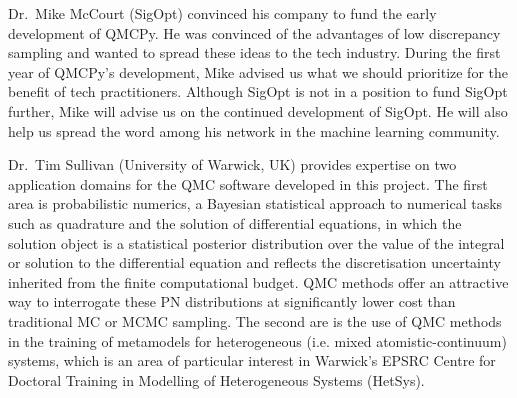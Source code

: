 \documentclass[11pt]{NSFamsart}
\begin{document}
Dr.\ Mike McCourt (SigOpt) convinced his company to fund the early development of QMCPy.  He was convinced of the advantages of low discrepancy sampling and wanted to spread these ideas to the tech industry.  During the first year of QMCPy's development, Mike advised us what we should prioritize for the benefit of tech practitioners.  Although SigOpt is not in a position to  fund SigOpt further, Mike will advise us on the continued development of SigOpt.  He will also help us spread the word among his network in the machine learning community.

Dr.\ Tim Sullivan (University of Warwick, UK) provides expertise on two application domains for the QMC software developed in this project.  The first area is probabilistic numerics, a Bayesian statistical approach to numerical tasks such as quadrature and the solution of differential equations, in which the solution object is a statistical posterior distribution over the value of the integral or solution to the differential equation and reflects the discretisation uncertainty inherited from the finite computational budget.  QMC methods offer an attractive way to interrogate these PN distributions at significantly lower cost than traditional MC or MCMC sampling.  The second are is the use of QMC methods in the training of metamodels for heterogeneous (i.e. mixed atomistic-continuum) systems, which is an area of particular interest in Warwick's EPSRC Centre for Doctoral Training in Modelling of Heterogeneous Systems (HetSys).




\newpage
\clearpage
\setcounter{page}{1}




{\renewcommand\addcontentsline[3]{} 
\renewcommand{\refname}{{\Large\textbf{References Cited}}}                   %
\renewcommand{\bibliofont}{\normalsize}

}
\end{document}
